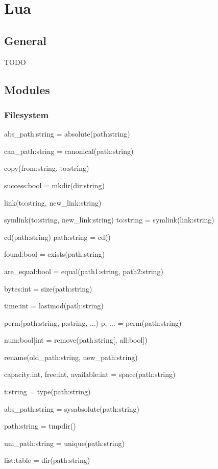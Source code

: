 \section{Lua}
\label{sec:lua}

\subsection{General}
\label{sec:general}

TODO

\subsection{Modules}
\label{sec:modules}

\subsubsection{Filesystem}
\label{sec:filesystem}

abs\_path:string = absolute(path:string)

can\_path:string = canonical(path:string)

copy(from:string, to:string)

success:bool = mkdir(dir:string)

link(to:string, new\_link:string)

symlink(to:string, new\_link:string)
to:string = symlink(link:string)

cd(path:string)
path:string = cd()

found:bool = exists(path:string)

are\_equal:bool = equal(path1:string, path2:string)

bytes:int = size(path:string)

time:int = lastmod(path:string)

perm(path:string, p:string, ...)
p, ... = perm(path:string)

num:bool|int = remove(path:string[, all:bool])

rename(old\_path:string, new\_path:string)

capacity:int, free:int, available:int = space(path:string)

t:string = type(path:string)

abs\_path:string = sysabsolute(path:string)

path:string = tmpdir()

uni\_path:string = unique(path:string)

list:table = dir(path:string)

